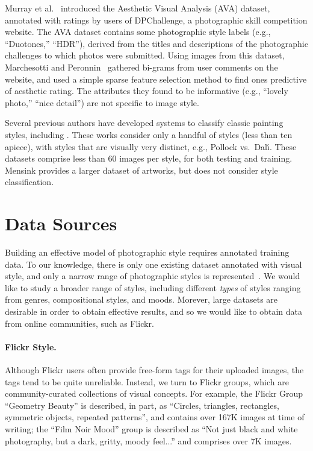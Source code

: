 Murray et al.~\parencite{Murray-CVPR-2012} introduced the Aesthetic Visual Analysis (AVA) dataset, annotated with ratings by users of DPChallenge, a photographic skill competition website.
The AVA dataset contains some photographic style labels (e.g., ``Duotones,'' ``HDR''), derived from the titles and descriptions of the photographic challenges to which photos were submitted.
Using images from this dataset, Marchesotti and Peronnin~\parencite{Marchesotti-BMVC-2013} gathered bi-grams from user comments on the website, and used a simple sparse feature selection method to find ones predictive of aesthetic rating.
The attributes they found to be informative (e.g., ``lovely photo,'' ``nice detail'') are not specific to image style.

Several previous authors have developed systems to classify classic painting styles, including \parencite{keren2002,shamir2010}.
These works consider only a handful of styles (less than ten apiece), with styles that are visually very distinct, e.g., Pollock vs.~Dal\'{\i}.
These datasets comprise less than 60 images per style, for both testing and training.
Mensink \parencite{Mensink2014} provides a larger dataset of artworks, but does not consider style classification.

\section{Data Sources}

Building an effective model of photographic style requires annotated training data.  To our knowledge, there is only one existing dataset annotated with visual style, and only a narrow range of photographic styles is represented~\parencite{Murray-CVPR-2012}.
We would like to study a broader range of styles, including different \textit{types} of styles ranging from genres, compositional styles, and moods.
Morever, large datasets are desirable in order to obtain effective results, and so we would like to obtain data from online communities, such as Flickr.

\paragraph{Flickr Style.}
Although Flickr users often provide free-form tags for their uploaded images, the tags tend to be quite unreliable.
Instead, we turn to Flickr groups, which are community-curated collections of visual concepts.
For example, the Flickr Group ``Geometry Beauty'' is described, in part, as ``Circles, triangles, rectangles, symmetric objects, repeated patterns'', and contains over 167K images at time of writing; the ``Film Noir Mood'' group is described as ``Not just  black and white photography, but a dark, gritty, moody feel...'' and comprises over 7K images.

